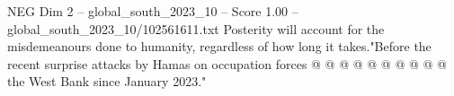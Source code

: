\begin{textsample}{NEG Dim 2 – global\_south\_2023\_10 – Score 1.00 – global\_south\_2023\_10/102561611.txt}
Posterity will account for the misdemeanours done to humanity, regardless of how long it takes."Before the recent surprise attacks by Hamas on occupation forces @ @ @ @ @ @ @ @ @ @ the West Bank since January 2023."

\end{textsample}

